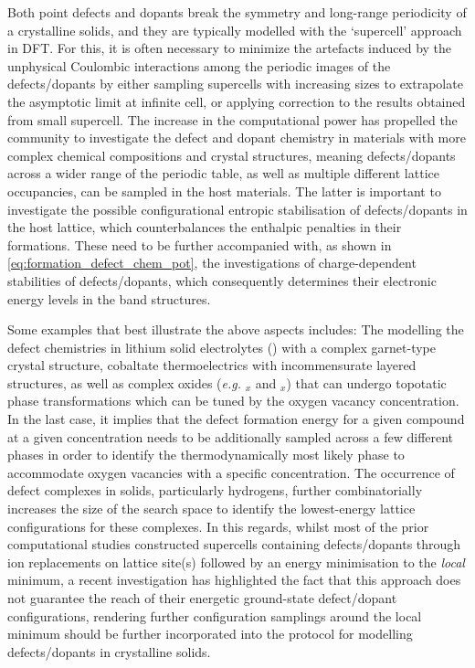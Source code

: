 Both point defects and dopants break the symmetry and long-range periodicity of a crystalline solids, and they are typically modelled with the `supercell' approach in DFT.\cite{makov1995periodic} For this, it is often necessary to minimize the artefacts induced by the unphysical Coulombic interactions among the periodic images of the defects/dopants by either sampling supercells with increasing sizes to extrapolate the asymptotic limit at infinite cell,\cite{kantorovich1999elimination} or applying correction to the results obtained from small supercell.\cite{freysoldt2009fully} The increase in the computational power has propelled the community to investigate the defect and dopant chemistry in materials with more complex chemical compositions and crystal structures, meaning defects/dopants across a wider range of the periodic table, as well as multiple different lattice occupancies, can be sampled in the host materials. The latter is important to investigate the possible configurational entropic stabilisation of defects/dopants in the host lattice, which counterbalances the enthalpic penalties in their formations. These need to be further accompanied with, as shown in \cref{eq:formation_defect_chem_pot}, the investigations of charge-dependent stabilities of defects/dopants, which consequently determines their electronic energy levels in the band structures. 

Some examples that best illustrate the above aspects includes: The modelling the defect chemistries in lithium  solid electrolytes () with a complex garnet-type crystal structure,\cite{miara2015first,squires2019native} cobaltate thermoelectrics with incommensurate layered structures,\cite{rebola2012first,lei2014synthesis} as well as complex oxides (\emph{e.g.} $_{x}$\cite{jeen2013topotactic} and $_{x}$\cite{nguyen2020topotactic}) that can undergo  topotatic phase transformations which can be tuned by the oxygen vacancy concentration. In the last case, it implies that the defect formation energy for a given compound at a given concentration needs to be additionally sampled across a few different phases in order to identify the thermodynamically most likely phase to accommodate oxygen vacancies with a specific concentration. The occurrence of defect complexes in solids, particularly hydrogens,\cite{morris2008hydrogen,lange2010native}  further combinatorially increases the size of the search space to identify the lowest-energy lattice configurations for these complexes. In this regards, whilst most of the prior computational studies constructed supercells containing defects/dopants through ion replacements on lattice site(s) followed by an energy minimisation to the \emph{local} minimum, a recent investigation\cite{mosquera2022identifying} has highlighted the fact that this approach does not guarantee the reach of their energetic ground-state defect/dopant configurations, rendering further configuration samplings around the local minimum should be further incorporated into the protocol for modelling defects/dopants in crystalline solids.


